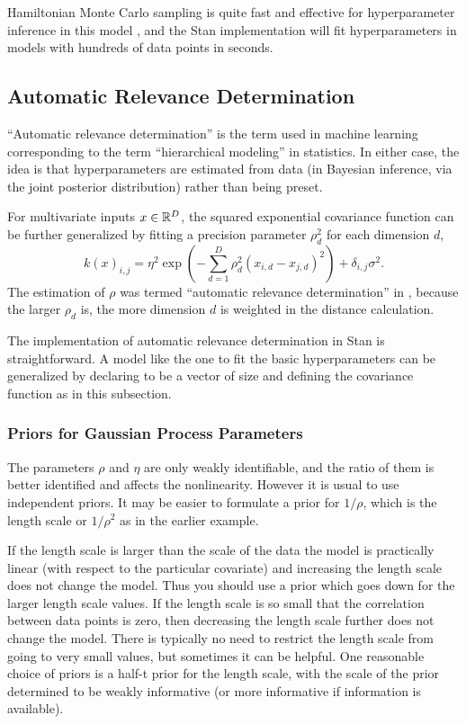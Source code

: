 Hamiltonian Monte Carlo sampling is quite fast and effective for
hyperparameter inference in this model \citep{Neal:1997}, and the Stan
implementation will fit hyperparameters in models with hundreds of
data points in seconds.

\subsection{Automatic Relevance Determination}

``Automatic relevance determination'' is the term used in machine
learning corresponding to the term ``hierarchical modeling'' in
statistics.  In either case, the idea is that hyperparameters are
estimated from data (in Bayesian inference, via the joint posterior
distribution) rather than being preset.

For multivariate inputs $x \in \reals^D$, the squared exponential
covariance function can be further generalized by fitting a precision
parameter $\rho_d^2$ for each dimension $d$,
\[
k(x)_{i,j} = \eta^2 \exp 
\left(
- \sum_{d=1}^D \rho_d^2 (x_{i,d} - x_{j,d})^2
\right)
+ \delta_{i,j}\sigma^2.
\]
The estimation of $\rho$ was termed ``automatic relevance
determination'' in \citep{Neal:1996}, because the larger $\rho_d$ is,
the more dimension $d$ is weighted in the distance calculation.

The implementation of automatic relevance determination in Stan is
straightforward.  A model like the one to fit the basic
hyperparameters can be generalized by declaring  to be a
vector of size  and defining the covariance function as in
this subsection.


\subsubsection{Priors for Gaussian Process Parameters}

The parameters $\rho$ and $\eta$ are only weakly identifiable, and the
ratio of them is better identified and affects the
nonlinearity. However it is usual to use independent priors.  It may
be easier to formulate a prior for $1/\rho$, which is the length
scale or $1/\rho^2$ as in the earlier example.  

If the length scale is larger than the scale of the data the model is
practically linear (with respect to the particular covariate) and
increasing the length scale does not change the model. Thus you should
use a prior which goes down for the larger length scale values. If the
length scale is so small that the correlation between data points is
zero, then decreasing the length scale further does not change the
model. There is typically no need to restrict the length scale from
going to very small values, but sometimes it can be helpful.  One
reasonable choice of priors is a half-t prior for the length scale,
with the scale of the prior determined to be weakly informative (or
more informative if information is available).

